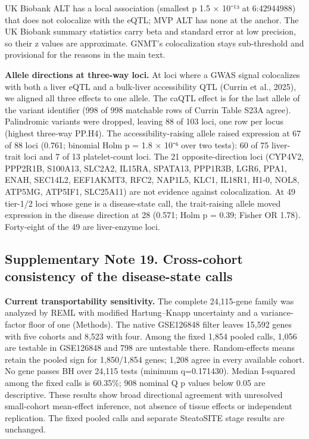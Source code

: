 UK Biobank ALT has a local association (smallest p 1.5 × 10⁻¹³ at 6:42944988) that does not colocalize with the eQTL; MVP ALT has none at the anchor. The UK Biobank summary statistics carry beta and standard error at low precision, so their z values are approximate. GNMT's colocalization stays sub-threshold and provisional for the reasons in the main text.

\textbf{Allele directions at three-way loci.} At loci where a GWAS signal colocalizes with both a liver eQTL and a bulk-liver accessibility QTL (Currin et al., 2025), we aligned all three effects to one allele. The caQTL effect is for the last allele of the variant identifier (998 of 998 matchable rows of Currin Table S23A agree). Palindromic variants were dropped, leaving 88 of 103 loci, one row per locus (highest three-way PP.H4). The accessibility-raising allele raised expression at 67 of 88 loci (0.761; binomial Holm p = 1.8 × 10⁻⁶ over two tests): 60 of 75 liver-trait loci and 7 of 13 platelet-count loci. The 21 opposite-direction loci (CYP4V2, PPP2R1B, S100A13, SLC2A2, IL15RA, SPATA13, PPP1R3B, LGR6, PPA1, ENAH, SEC14L2, EEF1AKMT3, RFC2, NAP1L5, KLC1, IL18R1, H1-0, NOL8, ATP5MG, ATP5IF1, SLC25A11) are not evidence against colocalization. At 49 tier-1/2 loci whose gene is a disease-state call, the trait-raising allele moved expression in the disease direction at 28 (0.571; Holm p = 0.39; Fisher OR 1.78). Forty-eight of the 49 are liver-enzyme loci.

\subsection{Supplementary Note 19. Cross-cohort consistency of the disease-state calls}\label{supplementary-note-19.-cross-cohort-consistency-of-the-disease-state-calls}

\textbf{Current transportability sensitivity.} The complete 24,115-gene family was
analyzed by REML with modified Hartung--Knapp uncertainty and a variance-factor
floor of one (Methods). The native GSE126848 filter leaves 15,592 genes with
five cohorts and 8,523 with four. Among the fixed 1,854 pooled calls, 1,056 are
testable in GSE126848 and 798 are untestable there. Random-effects means retain
the pooled sign for 1,850/1,854 genes; 1,208 agree in every available cohort.
No gene passes BH over 24,115 tests (minimum q=0.171430). Median I-squared among
the fixed calls is 60.35\%; 908 nominal Q p values below 0.05 are descriptive.
These results show broad directional agreement with unresolved small-cohort
mean-effect inference, not absence of tissue effects or independent replication.
The fixed pooled calls and separate SteatoSITE stage results are unchanged.

